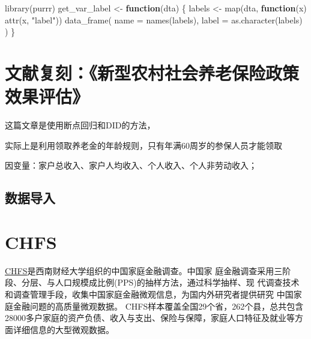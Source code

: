 \documentclass[
  oneside]{book}
\newenvironment{Shaded}{\begin{snugshade}}{\end{snugshade}}
\newcommand{\AttributeTok}[1]{\textcolor[rgb]{0.77,0.63,0.00}{#1}}
\newcommand{\ControlFlowTok}[1]{\textcolor[rgb]{0.13,0.29,0.53}{\textbf{#1}}}
\newcommand{\FunctionTok}[1]{\textcolor[rgb]{0.00,0.00,0.00}{#1}}
\newcommand{\NormalTok}[1]{#1}
\newcommand{\OtherTok}[1]{\textcolor[rgb]{0.56,0.35,0.01}{#1}}
\newcommand{\StringTok}[1]{\textcolor[rgb]{0.31,0.60,0.02}{#1}}
\begin{document}
\begin{Shaded}
\begin{Highlighting}[]
\FunctionTok{library}\NormalTok{(purrr)}
\NormalTok{get\_var\_label }\OtherTok{\textless{}{-}} \ControlFlowTok{function}\NormalTok{(dta) \{}
\NormalTok{  labels }\OtherTok{\textless{}{-}} \FunctionTok{map}\NormalTok{(dta, }\ControlFlowTok{function}\NormalTok{(x) }\FunctionTok{attr}\NormalTok{(x, }\StringTok{"label"}\NormalTok{))}
  \FunctionTok{data\_frame}\NormalTok{(}
    \AttributeTok{name =} \FunctionTok{names}\NormalTok{(labels),}
    \AttributeTok{label =} \FunctionTok{as.character}\NormalTok{(labels)}
\NormalTok{  )}
\NormalTok{\}}
\end{Highlighting}
\end{Shaded}

\hypertarget{ux6587ux732eux590dux523bux65b0ux578bux519cux6751ux793eux4f1aux517bux8001ux4fddux9669ux653fux7b56ux6548ux679cux8bc4ux4f30}{%
\chapter{文献复刻：《新型农村社会养老保险政策效果评估》}\label{ux6587ux732eux590dux523bux65b0ux578bux519cux6751ux793eux4f1aux517bux8001ux4fddux9669ux653fux7b56ux6548ux679cux8bc4ux4f30}}

这篇文章是使用断点回归和DID的方法，

实际上是利用领取养老金的年龄规则，只有年满60周岁的参保人员才能领取

因变量：家户总收入、家户人均收入、个人收入、个人非劳动收入；

\hypertarget{ux6570ux636eux5bfcux5165-1}{%
\section{数据导入}\label{ux6570ux636eux5bfcux5165-1}}

\hypertarget{chfs}{%
\chapter{CHFS}\label{chfs}}

\href{https://chfs.swufe.edu.cn/}{CHFS}是西南财经大学组织的中国家庭金融调查。中国家
庭金融调查采用三阶段、分层、与人口规模成比例(PPS)的抽样方法，通过科学抽样、现
代调查技术和调查管理手段，收集中国家庭金融微观信息，为国内外研究者提供研究
中国家庭金融问题的高质量微观数据。
CHFS样本覆盖全国29个省，262个县，总共包含28000多户家庭的资产负债、收入与支出、保险与保障，家庭人口特征及就业等方面详细信息的大型微观数据。
\end{document}
